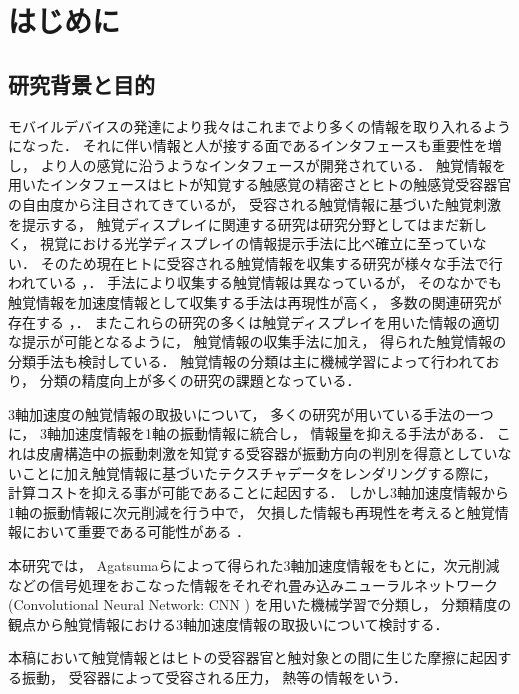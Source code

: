 
\chapter{はじめに}
\section{研究背景と目的}
モバイルデバイスの発達により我々はこれまでより多くの情報を取り入れるようになった． それに伴い情報と人が接する面であるインタフェースも重要性を増し， より人の感覚に沿うようなインタフェースが開発されている． 触覚情報を用いたインタフェースはヒトが知覚する触感覚の精密さとヒトの触感覚受容器官の自由度から注目されてきているが， 受容される触覚情報に基づいた触覚刺激を提示する， 触覚ディスプレイに関連する研究は研究分野としてはまだ新しく， 視覚における光学ディスプレイの情報提示手法に比べ確立に至っていない． そのため現在ヒトに受容される触覚情報を収集する研究が様々な手法で行われている \cite{abdulali2016data}，\cite{strese2017content}．
手法により収集する触覚情報は異なっているが， そのなかでも触覚情報を加速度情報として収集する手法は再現性が高く， 多数の関連研究が存在する
\cite{kuchenbecker2010verrotouch}，\cite{romano2011creating}． 
またこれらの研究の多くは触覚ディスプレイを用いた情報の適切な提示が可能となるように， 触覚情報の収集手法に加え， 得られた触覚情報の分類手法も検討している． 触覚情報の分類は主に機械学習によって行われており， 分類の精度向上が多くの研究の課題となっている． 

3軸加速度の触覚情報の取扱いについて， 多くの研究が用いている手法の一つに， 3軸加速度情報を1軸の振動情報に統合し， 情報量を抑える手法がある． これは皮膚構造中の振動刺激を知覚する受容器が振動方向の判別を得意としていないこと\cite{brisben1999detection}に加え触覚情報に基づいたテクスチャデータをレンダリングする際に， 計算コストを抑える事が可能であることに起因する． 
しかし3軸加速度情報から1軸の振動情報に次元削減を行う中で， 欠損した情報も再現性を考えると触覚情報において重要である可能性がある \cite{kurogi}．

本研究では， Agatsumaら\cite{agatsuma}によって得られた3軸加速度情報をもとに，次元削減などの信号処理をおこなった情報をそれぞれ畳み込みニューラルネットワーク (Convolutional Neural Network:  CNN \cite{lecun}) を用いた機械学習で分類し， 分類精度の観点から触覚情報における3軸加速度情報の取扱いについて検討する． 

本稿において触覚情報とはヒトの受容器官と触対象との間に生じた摩擦に起因する振動， 受容器によって受容される圧力， 熱等の情報をいう． 

